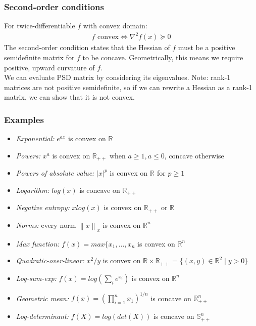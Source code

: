 \documentclass{article}
\newcommand{\norm}[2]{\left\lVert#1\right\rVert_#2}
\newcommand{\abs}[1]{\lvert#1\rvert}
\begin{document}
\subsubsection{Second-order conditions}
For twice-differentiable $f$ with convex domain:
\begin{align*}
  \textrm{$f$ convex} \Longleftrightarrow \nabla^2f(x) \succeq 0
\end{align*}
The second-order condition states that the Hessian of $f$ must be a positive semidefinite matrix for $f$ to be concave. Geometrically, this means we require positive, upward curvature of $f$.\\
We can evaluate PSD matrix by considering its eigenvalues. Note: rank-1 matrices are not positive semidefinite, so if we can rewrite a Hessian as a rank-1 matrix, we can show that it is not convex.

\subsubsection{Examples}
\begin{itemize}
  \item \textit{Exponential:} $e^{ax}$ is convex on $\mathbb{R}^{}$
  \item \textit{Powers:} $x^a$ is convex on $\mathbb{R}_{++}$ when $a \geq 1, a \leq 0$, concave otherwise
  \item \textit{Powers of absolute value:} $\abs{x}^p$ is convex on $\mathbb{R}^{}$ for $p \geq 1$
  \item \textit{Logarithm:} $log(x)$ is concave on $\mathbb{R}_{++}$
  \item \textit{Negative entropy:} $x log(x)$ is convex on $\mathbb{R}_{++}$ or $\mathbb{R}$
  \item \textit{Norms:} every norm $\norm{x}{x}$ is convex on $\mathbb{R}^n_{}$
  \item \textit{Max function:} $f(x) = max\{x_1, \dots, x_n$ is convex on $\mathbb{R}^n_{}$
  \item \textit{Quadratic-over-linear:} $x^2/y$ is convex on $\mathbb{R} \times \mathbb{R}_{++} = \{(x,y) \in \mathbb{R}^2 \mid y > 0\}$
  \item \textit{Log-sum-exp:} $f(x) = log(\sum_ie^{x_i})$ is convex on $\mathbb{R}^n_{}$
  \item \textit{Geometric mean:} $f(x) = (\prod_{i=1}^n x_1)^{1/n}$ is concave on $\mathbb{R}^n_{++}$
  \item \textit{Log-determinant:} $f(X) = log(det(X))$ is concave on $\mathbb{S}^n_{++}$
\end{itemize}
\end{document}
